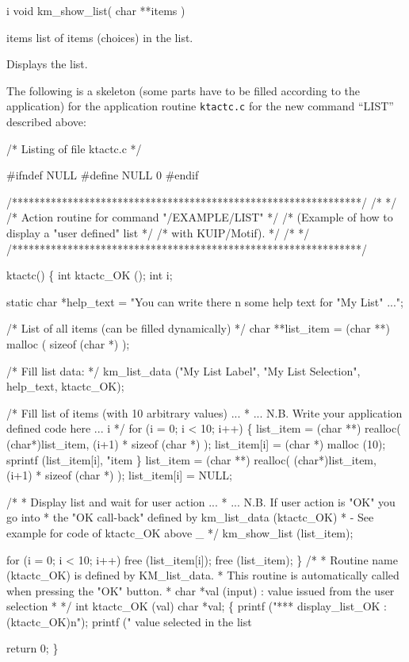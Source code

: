  
\begin{Gray}{i}
void km_show_list( char **items )
\end{Gray}
\Pdesc\begin{DLtt}{\mbox{\hspace{7em}}}
\item[items]  list of items (choices) in the list.
\end{DLtt}
Displays the list.
 
The following is a skeleton (some parts have to be filled according to
the application) for the application routine \texttt{ktactc.c} for the
new command ``LIST'' described above:
\begin{XMP}
/* Listing of file ktactc.c */
 
#ifndef NULL
#define NULL 0
#endif
 
/***************************************************************/
/*                                                             */
/* Action routine for command "/EXAMPLE/LIST"                  */
/* (Example of how to display a "user defined" list            */
/*  with KUIP/Motif).                                          */
/*                                                             */
/***************************************************************/
 
ktactc()
\{
  int ktactc_OK ();
  int i;
 
  static char *help_text = "You can write there \bs{}n\bs{}
some help text for \bs{}"My List\bs{}" ...";
 
  /* List of all items (can be filled dynamically) */
  char **list_item = (char **) malloc ( sizeof (char *) );
 
  /* Fill list data: */
  km_list_data
     ("My List Label", "My List Selection", help_text, ktactc_OK);
 
  /* Fill list of items (with 10 arbitrary values) ...
   * ... N.B. Write your application defined code here ... i
   */
  for (i = 0; i < 10; i++) \{
       list_item = (char **) realloc( (char*)list_item,
                                        (i+1) * sizeof (char *) );
       list_item[i] = (char *) malloc (10);
       sprintf (list_item[i], "item %
  \}
  list_item = (char **) realloc( (char*)list_item, (i+1) * sizeof (char *) );
  list_item[i] = NULL;
 
  /*
   * Display list and wait for user action ...
   * ... N.B. If user action is "OK" you go into
   * the "OK call-back" defined by km_list_data (ktactc_OK)
   * - See example for code of ktactc_OK above _
   */
  km_show_list (list_item);
 
  for (i = 0; i < 10; i++) free (list_item[i]);
  free (list_item);
\}
\vfill 
/*
 * Routine name (ktactc_OK) is defined by KM_list_data.
 * This routine is automatically called when pressing the "OK" button.
 *      char *val (input) : value issued from the user selection
 *
 */
int ktactc_OK (val)
    char *val;
\{
    printf ("*** display_list_OK : (ktactc_OK)\bs{}n");
    printf ("    value selected in the list %
 
    return 0;
\}
\end{XMP}
 
